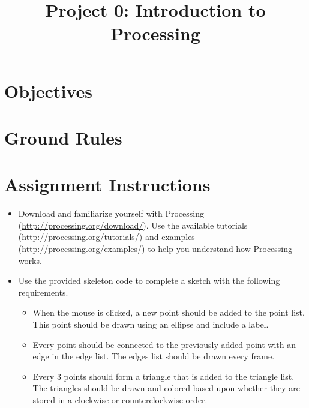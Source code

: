\documentclass[a4paper,12pt]{article}
\title{Project 0: Introduction to Processing}
\begin{document}
\maketitle

\section{Objectives}



\vspace{5pt}
\section{Ground Rules}


\vspace{5pt}
\section{Assignment Instructions}

\begin{itemize}

\item Download and familiarize yourself with Processing (\url{http://processing.org/download/}). Use the available tutorials (\url{http://processing.org/tutorials/}) and examples (\url{http://processing.org/examples/}) to help you understand how Processing works.


\item Use the provided skeleton code to complete a sketch with the following requirements.

\begin{itemize}

\item When the mouse is clicked, a new point should be added to the point list. This point should be drawn using an ellipse and include a label.

\item Every point should be connected to the previously added point with an edge in the edge list. The edges list should be drawn every frame.

\item Every 3 points should form a triangle that is added to the triangle list. The triangles should be drawn and colored based upon whether they are stored in a clockwise or counterclockwise order.

\end{itemize}

\end{itemize}
\end{document}

